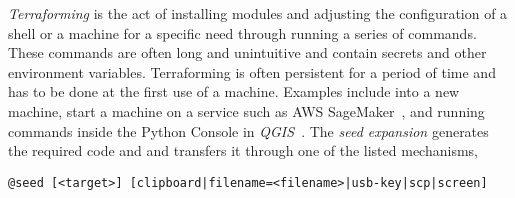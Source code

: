 
\emph{Terraforming} is the act of installing modules and adjusting the configuration of a shell or a machine for a specific need through running a series of commands. These commands are often long and unintuitive and contain secrets and other environment variables. Terraforming is often persistent for a period of time and has to be done at the first use of a machine. Examples include  into a new machine, start a machine on a service such as AWS SageMaker~\cite{sagemaker}, and running commands inside the Python Console in \emph{QGIS}~\cite{QGIS_python_console}. The \emph{seed expansion} generates the required code and and transfers it through one of the listed mechanisms,
%
\begin{verbatim}
@seed [<target>] [clipboard|filename=<filename>|usb-key|scp|screen]
\end{verbatim}
